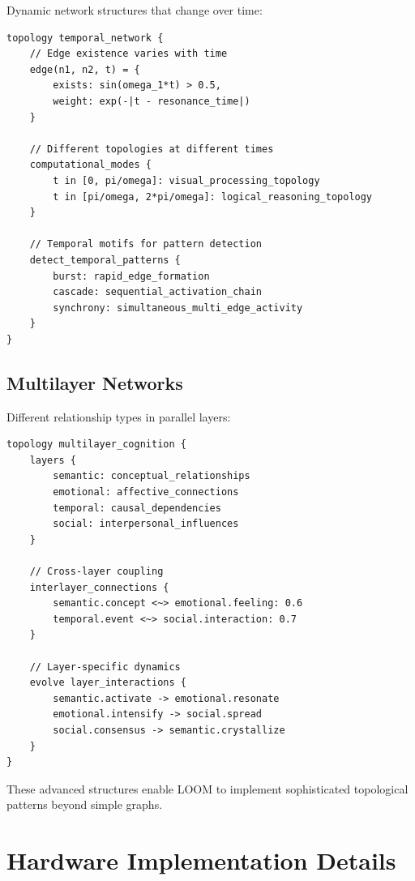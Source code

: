 \documentclass[12pt,a4paper,openany]{book} %
\begin{document}
Dynamic network structures that change over time:

\vspace{0.5em}
\begin{lstlisting}[language=loom]
topology temporal_network {
    // Edge existence varies with time
    edge(n1, n2, t) = {
        exists: sin(omega_1*t) > 0.5,
        weight: exp(-|t - resonance_time|)
    }

    // Different topologies at different times
    computational_modes {
        t in [0, pi/omega]: visual_processing_topology
        t in [pi/omega, 2*pi/omega]: logical_reasoning_topology
    }

    // Temporal motifs for pattern detection
    detect_temporal_patterns {
        burst: rapid_edge_formation
        cascade: sequential_activation_chain
        synchrony: simultaneous_multi_edge_activity
    }
}
\end{lstlisting}
\vspace{0.5em}

\section{Multilayer Networks}

Different relationship types in parallel layers:

\vspace{0.5em}
\begin{lstlisting}[language=loom]
topology multilayer_cognition {
    layers {
        semantic: conceptual_relationships
        emotional: affective_connections
        temporal: causal_dependencies
        social: interpersonal_influences
    }

    // Cross-layer coupling
    interlayer_connections {
        semantic.concept <~> emotional.feeling: 0.6
        temporal.event <~> social.interaction: 0.7
    }

    // Layer-specific dynamics
    evolve layer_interactions {
        semantic.activate -> emotional.resonate
        emotional.intensify -> social.spread
        social.consensus -> semantic.crystallize
    }
}
\end{lstlisting}
\vspace{0.5em}

These advanced structures enable LOOM to implement sophisticated topological patterns beyond simple graphs.

\chapter{Hardware Implementation Details}
\end{document}
